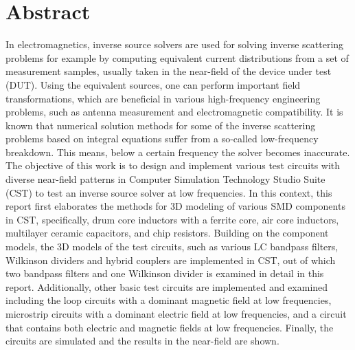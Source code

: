 

\chapter*{Abstract} 								%


In electromagnetics, inverse source solvers are used for solving inverse scattering problems for example by computing equivalent current distributions from a set of measurement samples, usually taken in the near-field of the device under test (DUT). Using the equivalent sources, one can perform important field transformations, which are beneficial in various high-frequency engineering problems, such as antenna measurement and electromagnetic compatibility. It is known that numerical solution methods for some of the inverse scattering problems based on integral equations suffer from a so-called low-frequency breakdown. This means, below a certain frequency the solver becomes inaccurate. The objective of this work is to design and implement various test circuits with diverse near-field patterns in Computer Simulation Technology Studio Suite (CST) to test an inverse source solver at low frequencies. In this context, this report first elaborates the methods for 3D modeling of various SMD components in CST, specifically, drum core inductors with a ferrite core, air core inductors, multilayer ceramic capacitors, and chip resistors. Building on the component models, the 3D models of the test circuits, such as various LC bandpass filters, Wilkinson dividers and hybrid couplers are implemented in CST, out of which two bandpass filters and one Wilkinson divider is examined in detail in this report. Additionally, other basic test circuits are implemented and examined including the loop circuits with a dominant magnetic field at low frequencies, microstrip circuits with a dominant electric field at low frequencies, and a circuit that contains both electric and magnetic fields at low frequencies. Finally, the circuits are simulated and the results in the near-field are shown.


%
%	

